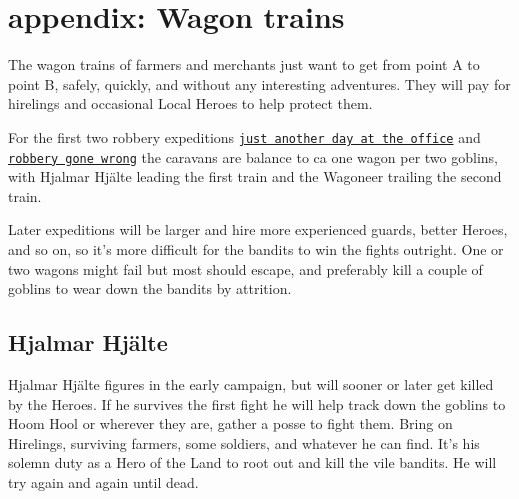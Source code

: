 \section*{appendix: Wagon trains}
\label{wagontrains}

The wagon trains of farmers and merchants just want to get from point A to point B, safely, quickly, and without any interesting adventures. They will pay for hirelings and occasional Local Heroes to help protect them. 

For the first two robbery expeditions 
\hyperref[00justanotherdayattheoffice]{\texttt{just another day at the office}} and 
\hyperref[01robberygonewrong]{\texttt{robbery gone wrong}}
the caravans are balance to ca one wagon per two goblins, with Hjalmar Hjälte leading the first train and the Wagoneer trailing the second train.

Later expeditions will be larger and hire more experienced guards, better Heroes, and so on, so it's more difficult for the bandits to win the fights outright. One or two wagons might fail but most should escape, and preferably kill a couple of goblins to wear down the bandits by attrition.


\subsection*{Hjalmar Hjälte}
\label{hjalmarhjalte}

Hjalmar Hjälte figures in the early campaign, but will sooner or later get killed by the Heroes. If he survives the first fight he will help track down the goblins to Hoom Hool or wherever they are, gather a posse to fight them. Bring on Hirelings, surviving farmers, some soldiers, and whatever he can find. It's his solemn duty as a Hero of the Land to root out and kill the vile bandits. He will try again and again until dead.

\

